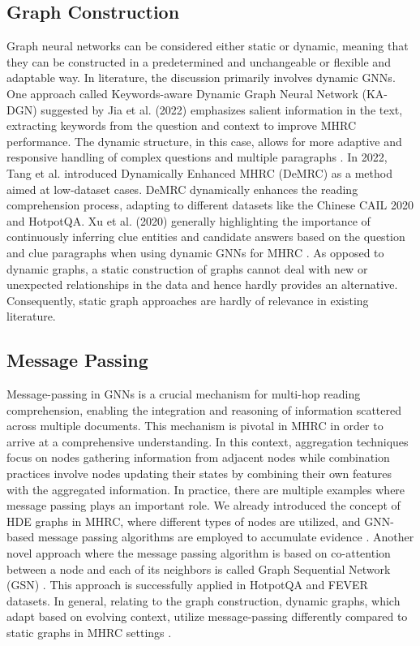 \documentclass[sigplan,screen,nonacm]{acmart}
\begin{document}
\subsection{Graph Construction}
Graph neural networks can be considered either static or dynamic, meaning that they can be constructed in a predetermined and unchangeable or flexible 
and adaptable way. In literature, the discussion primarily involves dynamic GNNs. One approach called Keywords-aware Dynamic Graph Neural Network (KA-DGN)
suggested by Jia et al. (2022) \cite{RN171b} emphasizes salient information in the text, extracting keywords from the question and context to improve MHRC performance.
The dynamic structure, in this case, allows for more adaptive and responsive handling of complex questions and multiple paragraphs \cite{RN171b}. In 2022, 
Tang et al. \cite{RN172} introduced Dynamically Enhanced MHRC (DeMRC) as a method aimed at low-dataset cases. DeMRC dynamically enhances the reading comprehension process,
adapting to different datasets like the Chinese CAIL 2020 and HotpotQA. Xu et al. (2020) generally highlighting the importance of continuously inferring
clue entities and candidate answers based on the question and clue paragraphs when using dynamic GNNs for MHRC \cite{RN173}. 
As opposed to dynamic graphs, a static construction of graphs cannot deal with new or unexpected relationships in the data and hence hardly
provides an alternative. Consequently, static graph approaches are hardly of relevance in existing literature. 

\subsection{Message Passing}
Message-passing in GNNs is a crucial mechanism for multi-hop reading comprehension, enabling the integration and reasoning of information scattered across multiple documents. 
This mechanism is pivotal in MHRC in order to arrive at a comprehensive understanding. In this context, aggregation techniques focus on nodes gathering information
from adjacent nodes while combination practices involve nodes updating their states by combining their own features with the aggregated information. In practice,
there are multiple examples where message passing plays an important role. We already introduced the concept of HDE graphs in MHRC, where different types of 
nodes are utilized, and GNN-based message passing algorithms are employed to accumulate evidence \cite{RN124}. Another novel approach where the message
passing algorithm is based on co-attention between a node and each of its neighbors is called Graph Sequential Network (GSN) \cite{RN210}. This approach is 
successfully applied in HotpotQA and FEVER datasets. In general, relating to the graph construction, dynamic graphs, which adapt based on evolving context, 
utilize message-passing differently compared to static graphs in MHRC settings \cite{RN171b}. 
\end{document}
